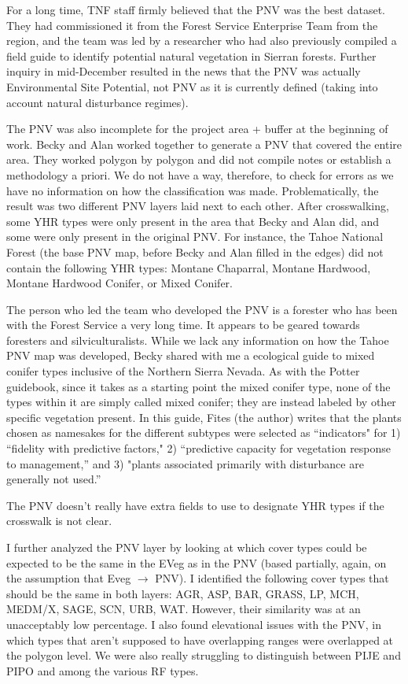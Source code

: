For a long time, TNF staff firmly believed that the PNV was the best dataset. They had commissioned it from the Forest Service Enterprise Team from the region, and the team was led by a researcher who had also previously compiled a field guide to identify potential natural vegetation in Sierran forests. Further inquiry in mid-December resulted in the news that the PNV was actually Environmental Site Potential, not PNV as it is currently defined (taking into account natural disturbance regimes).

The PNV was also incomplete for the project area + buffer at the beginning of work. Becky and Alan worked together to generate a PNV that covered the entire area. They worked polygon by polygon and did not compile notes or establish a methodology a priori. We do not have a way, therefore, to check for errors as we have no information on how the classification was made. Problematically, the result was two different PNV layers laid next to each other. After crosswalking, some YHR types were only present in the area that Becky and Alan did, and some were only present in the original PNV. For instance, the Tahoe National Forest (the base PNV map, before Becky and Alan filled in the edges) did not contain the following YHR types: Montane Chaparral, Montane Hardwood, Montane Hardwood Conifer, or Mixed Conifer.

The person who led the team who developed the PNV is a forester who has been with the Forest Service a very long time. It appears to be geared towards foresters and silviculturalists. While we lack any information on how the Tahoe PNV map was developed, Becky shared with me a ecological guide to mixed conifer types inclusive of the Northern Sierra Nevada. As with the Potter guidebook, since it takes as a starting point the mixed conifer type, none of the types within it are simply called mixed conifer; they are instead labeled by other specific vegetation present. In this guide, Fites (the author) writes that the plants chosen as namesakes for the different subtypes were selected as ``indicators" for 1) ``fidelity with predictive factors," 2) ``predictive capacity for vegetation response to management,'' and 3) "plants associated primarily with disturbance are generally not used.''

The PNV doesn't really have extra fields to use to designate YHR types if the crosswalk is not clear. 

I further analyzed the PNV layer by looking at which cover types could be expected to be the same in the EVeg as in the PNV (based partially, again, on the assumption that Eveg $\rightarrow$ PNV). I identified the following cover types that should be the same in both layers: AGR, ASP, BAR, GRASS, LP, MCH, MEDM/X, SAGE, SCN, URB, WAT. However, their similarity was at an unacceptably low percentage. I also found elevational issues with the PNV, in which types that aren't supposed to have overlapping ranges were overlapped at the polygon level. We were also really struggling to distinguish between PIJE and PIPO and among the various RF types.

